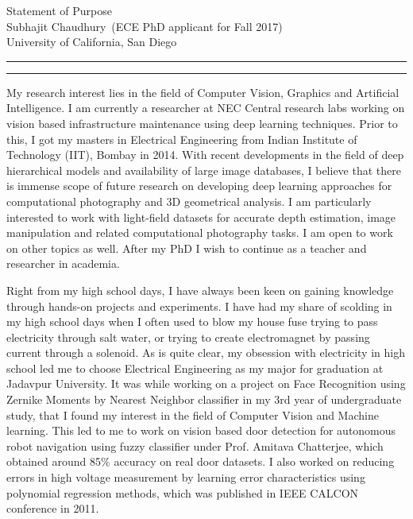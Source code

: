 \documentclass{article}
\newcommand{\soptitle}{Statement of Purpose}
\newcommand{\yourname}{Subhajit Chaudhury}
\begin{document}
	
	\begin{center}\LARGE\soptitle\\
	\large \yourname\ (ECE PhD applicant for Fall 2017) \\ University of California, San Diego
	\end{center}
	
	\hrule
	\hrule height 1pt
	
	\bigskip
	
	My research interest lies in the field of Computer Vision, Graphics and Artificial Intelligence. I am currently a researcher at NEC Central research labs working on vision based infrastructure maintenance using deep learning techniques. Prior to this, I got my masters in Electrical Engineering from Indian Institute of Technology (IIT), Bombay in 2014. With recent developments in the field of deep hierarchical models and availability of large image databases, I believe that there is immense scope of future research on developing deep learning approaches for computational photography and 3D geometrical analysis. I am particularly interested to work with light-field datasets for accurate depth estimation, image manipulation and related computational photography tasks. I am open to work on other topics as well. After my PhD I wish to continue as a teacher and researcher in academia.
	
	\vspace{0.2cm}
	
	Right from my high school days, I have always been keen on gaining knowledge through hands-on projects and experiments. I have had my share of scolding in my high school days when I often used to blow my house fuse trying to pass electricity through salt water, or trying to create electromagnet by passing current through a solenoid. As is quite clear, my obsession with electricity in high school led me to choose Electrical Engineering as my major for graduation at Jadavpur University. It was while working on a project on Face Recognition using Zernike Moments by Nearest Neighbor classifier in my 3rd year of undergraduate study, that I found my interest in the field of Computer Vision and Machine learning. This led to me to work on vision based door detection for autonomous robot navigation using fuzzy classifier under Prof. Amitava Chatterjee, which obtained around 85\% accuracy on real door datasets. I also worked on reducing errors in high voltage measurement by learning error characteristics using polynomial regression methods, which was published in IEEE CALCON conference in 2011.
	
\end{document}
